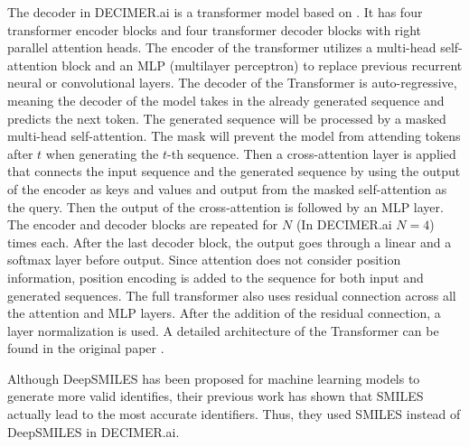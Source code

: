 \documentclass{article}
\begin{document}
The decoder in DECIMER.ai is a transformer model based on \autocite{attention_is_all_you_need}. It has four transformer encoder blocks and four transformer decoder blocks with right parallel attention heads. \autocite{decimer} The encoder of the transformer utilizes a multi-head self-attention block and an MLP (multilayer perceptron) to replace previous recurrent neural or convolutional layers. The decoder of the Transformer is auto-regressive, meaning the decoder of the model takes in the already generated sequence and predicts the next token. The generated sequence will be processed by a masked multi-head self-attention. The mask will prevent the model from attending tokens after $t$ when generating the $t$-th sequence. Then a cross-attention layer is applied that connects the input sequence and the generated sequence by using the output of the encoder as keys and values and output from the masked self-attention as the query. Then the output of the cross-attention is followed by an MLP layer. The encoder and decoder blocks are repeated for $N$ (In DECIMER.ai $N=4$) times each. After the last decoder block, the output goes through a linear and a softmax layer before output. Since attention does not consider position information, position encoding is added to the sequence for both input and generated sequences. The full transformer also uses residual connection across all the attention and MLP layers. After the addition of the residual connection, a layer normalization is used. A detailed architecture of the Transformer can be found in the original paper \autocite{attention_is_all_you_need}. 

Although DeepSMILES \autocite{oboyle_deepsmiles:_2018} has been proposed for machine learning models to generate more valid identifies, their previous work \autocite{rajan_performance_2022} has shown that SMILES actually lead to the most accurate identifiers. Thus, they used SMILES instead of DeepSMILES in DECIMER.ai. \autocite{decimer}  

\end{document}
